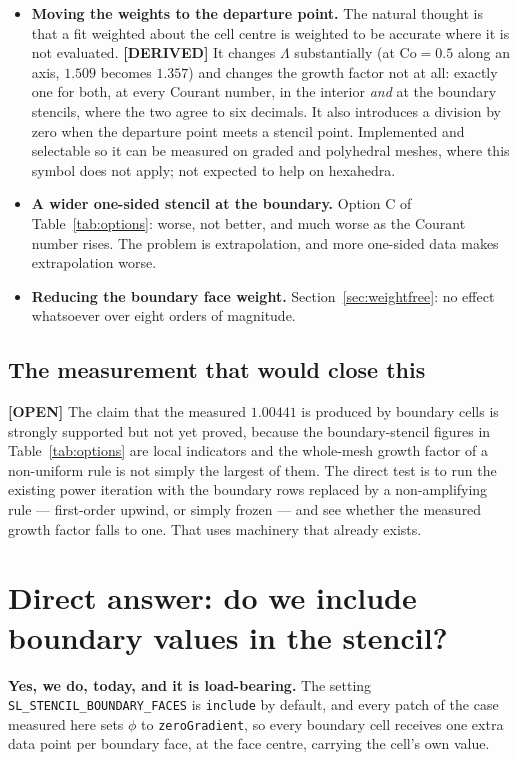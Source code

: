 \documentclass[11pt,a4paper]{article}
\newcommand{\derived}{\textcolor{blue!50!black}{\textbf{[DERIVED]}}}
\newcommand{\opn}{\textcolor{orange!80!black}{\textbf{[OPEN]}}}
\begin{document}
\begin{itemize}
\item \textbf{Moving the weights to the departure point.} The natural thought is that a fit
      weighted about the cell centre is weighted to be accurate where it is not evaluated.
      \derived{} It changes $\Lambda$ substantially (at $\mathrm{Co} = 0.5$ along an axis,
      $1.509$ becomes $1.357$) and changes the growth factor not at all: exactly one for both,
      at every Courant number, in the interior \emph{and} at the boundary stencils, where the
      two agree to six decimals. It also introduces a division by zero when the departure
      point meets a stencil point. Implemented and selectable so it can be measured on graded
      and polyhedral meshes, where this symbol does not apply; not expected to help on
      hexahedra.
\item \textbf{A wider one-sided stencil at the boundary.} Option C of
      Table~\ref{tab:options}: worse, not better, and much worse as the Courant number rises.
      The problem is extrapolation, and more one-sided data makes extrapolation worse.
\item \textbf{Reducing the boundary face weight.} Section~\ref{sec:weightfree}: no effect
      whatsoever over eight orders of magnitude.
\end{itemize}

\subsection{The measurement that would close this}

\opn{} The claim that the measured $1.00441$ is produced by boundary cells is strongly
supported but not yet proved, because the boundary-stencil figures in
Table~\ref{tab:options} are local indicators and the whole-mesh growth factor of a
non-uniform rule is not simply the largest of them. The direct test is to run the existing
power iteration with the boundary rows replaced by a non-amplifying rule --- first-order
upwind, or simply frozen --- and see whether the measured growth factor falls to one. That
uses machinery that already exists.

\section{Direct answer: do we include boundary values in the stencil?}
\label{sec:answer}

\textbf{Yes, we do, today, and it is load-bearing.} The setting
\texttt{SL\_STENCIL\_BOUNDARY\_FACES} is \texttt{include} by default, and every patch of the
case measured here sets $\phi$ to \texttt{zeroGradient}, so every boundary cell receives one
extra data point per boundary face, at the face centre, carrying the cell's own value.
\end{document}
